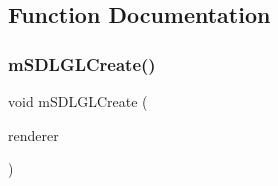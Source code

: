 \subsection{Function Documentation}
\mbox{\label{gl-sdl_8c_ad4bc3fc9cf378ca00da7328b0364161a}} 
\subsubsection{\texorpdfstring{m\+S\+D\+L\+G\+L\+Create()}{mSDLGLCreate()}}
{\footnotesize\ttfamily void m\+S\+D\+L\+G\+L\+Create (\begin{DoxyParamCaption}\item[{struct \mbox{\hyperlink{structm_s_d_l_renderer}{m\+S\+D\+L\+Renderer}} $\ast$}]{renderer }\end{DoxyParamCaption})}

